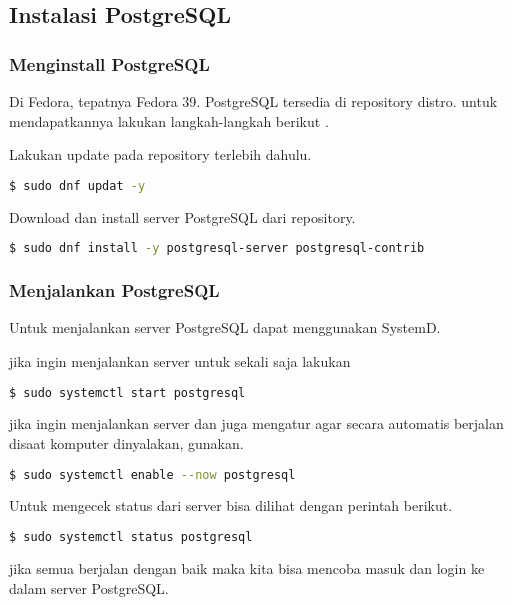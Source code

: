 \documentclass[12pt,a4paper]{article}
\begin{document}
\subsection{Instalasi PostgreSQL}

\subsubsection{Menginstall PostgreSQL}

Di Fedora, tepatnya Fedora 39. PostgreSQL tersedia di repository distro.
untuk mendapatkannya lakukan langkah-langkah berikut \cite{fedoradocs}.

Lakukan update pada repository terlebih dahulu.
\begin{lstlisting}[language=sh]
$ sudo dnf updat -y 
\end{lstlisting}

Download dan install server PostgreSQL dari repository.

\begin{lstlisting}[language=sh]
$ sudo dnf install -y postgresql-server postgresql-contrib
\end{lstlisting}

\subsubsection{Menjalankan PostgreSQL}

Untuk menjalankan server PostgreSQL dapat menggunakan SystemD.

jika ingin menjalankan server untuk sekali saja lakukan

\begin{lstlisting}[language=sh]
$ sudo systemctl start postgresql
\end{lstlisting}

jika ingin menjalankan server dan juga mengatur agar secara automatis berjalan
disaat komputer dinyalakan, gunakan.

\begin{lstlisting}[language=sh]
$ sudo systemctl enable --now postgresql
\end{lstlisting}

Untuk mengecek status dari server bisa dilihat dengan perintah berikut.

\begin{lstlisting}[language=sh]
$ sudo systemctl status postgresql
\end{lstlisting}

jika semua berjalan dengan baik maka kita bisa mencoba masuk dan login ke
dalam server PostgreSQL.
\end{document}
